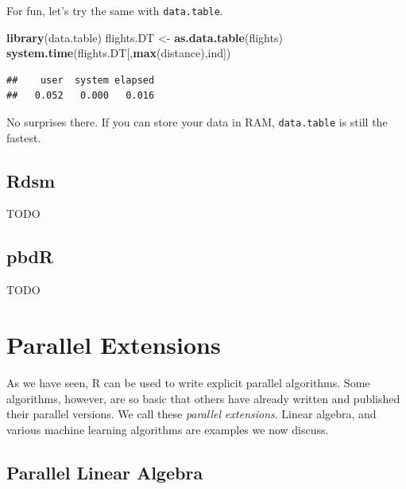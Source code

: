 \documentclass[]{book}
\newenvironment{Shaded}{\begin{snugshade}}{\end{snugshade}}
\newcommand{\KeywordTok}[1]{\textcolor[rgb]{0.13,0.29,0.53}{\textbf{#1}}}
\newcommand{\NormalTok}[1]{#1}
\newcommand{\StringTok}[1]{\textcolor[rgb]{0.31,0.60,0.02}{#1}}
\theoremstyle{definition}
\theoremstyle{definition}
\theoremstyle{definition}
\theoremstyle{remark}
\begin{document}
For fun, let's try the same with \texttt{data.table}.

\begin{Shaded}
\begin{Highlighting}[]
\KeywordTok{library}\NormalTok{(data.table)}
\NormalTok{flights.DT <-}\StringTok{ }\KeywordTok{as.data.table}\NormalTok{(flights)}
\KeywordTok{system.time}\NormalTok{(flights.DT[,}\KeywordTok{max}\NormalTok{(distance),ind])}
\end{Highlighting}
\end{Shaded}

\begin{verbatim}
##    user  system elapsed 
##   0.052   0.000   0.016
\end{verbatim}

No surprises there.
If you can store your data in RAM, \texttt{data.table} is still the fastest.

\hypertarget{rdsm}{%
\subsection{Rdsm}\label{rdsm}}

TODO

\hypertarget{pbdr}{%
\subsection{pbdR}\label{pbdr}}

TODO

\hypertarget{parallel-extensions}{%
\section{Parallel Extensions}\label{parallel-extensions}}

As we have seen, R can be used to write explicit parallel algorithms.
Some algorithms, however, are so basic that others have already written and published their parallel versions.
We call these \emph{parallel extensions}.
Linear algebra, and various machine learning algorithms are examples we now discuss.

\hypertarget{parallel-linear-algebra}{%
\subsection{Parallel Linear Algebra}\label{parallel-linear-algebra}}
\end{document}
